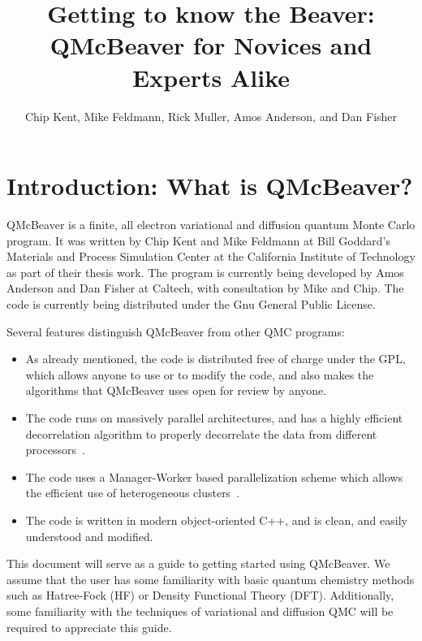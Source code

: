 \documentclass[11pt]{article}
\begin{document}
\title{Getting to know the Beaver:\\ QMcBeaver for Novices and Experts
  Alike}
\author{Chip Kent, Mike Feldmann, Rick Muller, Amos Anderson, and Dan Fisher}
\maketitle

\section{Introduction: What is QMcBeaver?}
QMcBeaver is a finite, all electron variational and diffusion quantum
Monte Carlo program.  It was written by Chip Kent and Mike Feldmann at
Bill Goddard's Materials and Process Simulation Center at the
California Institute of Technology as part of their thesis work. The
program is currently being developed by Amos Anderson and Dan Fisher
at Caltech, with consultation by Mike and Chip. The code is currently
being distributed under the Gnu General Public License.

Several features distinguish QMcBeaver from other QMC programs:
\begin{itemize}
\item As already mentioned, the code is distributed free of charge
  under the GPL, which allows anyone to use or to modify the code, and
  also makes the algorithms that QMcBeaver uses open for review by
  anyone.
\item The code runs on massively parallel architectures, and has a
  highly efficient decorrelation algorithm to properly decorrelate the
  data from different processors~\cite{DDDA}.
\item The code uses a Manager-Worker based parallelization scheme
  which allows the efficient use of heterogeneous clusters~\cite{QMC-MW}.
\item The code is written in modern object-oriented C++, and is clean,
  and easily understood and modified.


\end{itemize}

This document will serve as a guide to getting started using
QMcBeaver. We assume that the user has some familiarity with basic
quantum chemistry methods such as Hatree-Fock (HF) or Density
Functional Theory (DFT). Additionally, some familiarity with the
techniques of variational and diffusion QMC will be required to
appreciate this guide.
\end{document}
